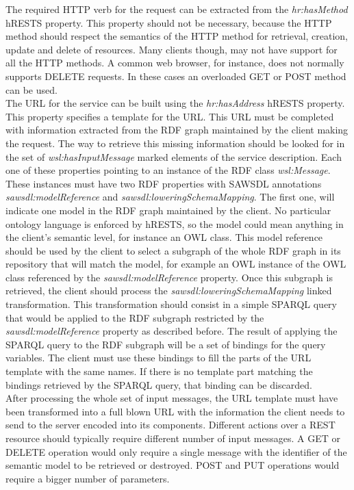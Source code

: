 The required HTTP verb for the request can be extracted from the \emph{hr:hasMethod} hRESTS property. This property should not be necessary, because the HTTP method should respect the semantics of the HTTP method for retrieval, creation, update and delete of resources. Many clients though, may not have support for all the HTTP methods. A common web browser, for instance, does not normally supports DELETE requests. In these cases an overloaded GET or POST method can be used.\\
The URL for the service can be built using the \emph{hr:hasAddress} hRESTS property. This property specifies a template for the URL. This URL must be completed with information extracted from the RDF graph maintained by the client making the request. The way to retrieve this missing information should be looked for in the set of \emph{wsl:hasInputMessage} marked elements of the service description. Each one of these properties pointing to an instance of the RDF class \emph{wsl:Message}. These instances must have two RDF properties with SAWSDL annotations \emph{sawsdl:modelReference} and \emph{sawsdl:loweringSchemaMapping}. The first one, will indicate one model in the RDF graph maintained by the client. No particular ontology language is enforced by hRESTS, so the model could mean anything in the client's semantic level, for instance an OWL class. This model reference should be used by the client to select a subgraph of the whole RDF graph in its repository that will match the model, for example an OWL instance of the OWL class referenced by the \emph{sawsdl:modelReference} property. Once this subgraph is retrieved, the client should process the \emph{sawsdl:loweringSchemaMapping} linked transformation. This transformation should consist in a simple SPARQL query that would be applied to the RDF subgraph restricted by the \emph{sawsdl:modelReference} property as described before. The result of applying the SPARQL query to the RDF subgraph will be a set of bindings for the query variables. The client must use these bindings to fill the parts of the URL template with the same names. If there is no template part matching the bindings retrieved by the SPARQL query, that binding can be discarded.\\
After processing the whole set of input messages, the URL template must have been transformed into a full blown URL with the information the client needs to send to the server encoded into its components. Different actions over a REST resource should typically require different number of input messages. A GET or DELETE operation would only require a single message with the identifier of the semantic model to be retrieved or destroyed. POST and PUT operations would require a bigger number of parameters.\\

